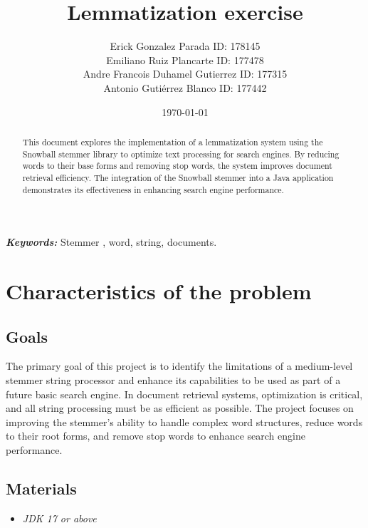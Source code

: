 \documentclass[twoside]{article}
\begin{document}

\title{Lemmatization exercise}
\author{\small{Erick Gonzalez Parada ID: 178145}\\
  \small{Emiliano Ruiz Plancarte ID: 177478} \\
  \small{Andre Francois Duhamel Gutierrez ID: 177315} \\
\small{Antonio Gutiérrez Blanco ID: 177442}}
\date{\today}
\maketitle

\begin{abstract}
  \raggedright
  This document explores the implementation of a lemmatization system using the Snowball stemmer library to optimize text processing for search engines. By reducing words to their base forms and removing stop words, the system improves document retrieval efficiency. The integration of the Snowball stemmer into a Java application demonstrates its effectiveness in enhancing search engine performance.
\end{abstract}

\begin{justify}
  \textbf{\textit{Keywords:}} Stemmer , word, string, documents.
\end{justify}

\section{Characteristics of the problem}
\subsection*{Goals}
The primary goal of this project is to identify the limitations of a medium-level stemmer string processor and enhance its capabilities to be used as part of a future basic search engine. In document retrieval systems, optimization is critical, and all string processing must be as efficient as possible. The project focuses on improving the stemmer's ability to handle complex word structures, reduce words to their root forms, and remove stop words to enhance search engine performance.

\subsection*{Materials}
\begin{itemize}
  \item \textit{JDK 17 or above}
\end{itemize}
\end{document}
